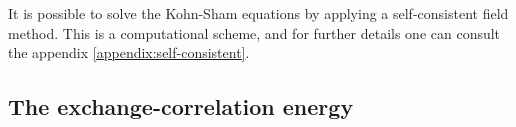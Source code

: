 It is possible to solve the Kohn-Sham equations by applying a self-consistent field method. This is a computational scheme, and for further details one can consult the appendix \ref{appendix:self-consistent}.




\subsection{The exchange-correlation energy}


